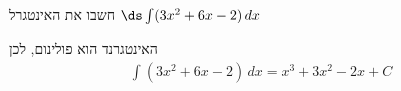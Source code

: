 חשבו את האינטגרל
$\ds \int(3x^2 + 6x - 2) \, dx$
\begin{solbox}
האינטגרנד הוא פולינום, לכן
\begin{align*}
\int (3x^2+6x-2)\,dx=x^3+3x^2-2x+C
\end{align*}
\end{solbox}
